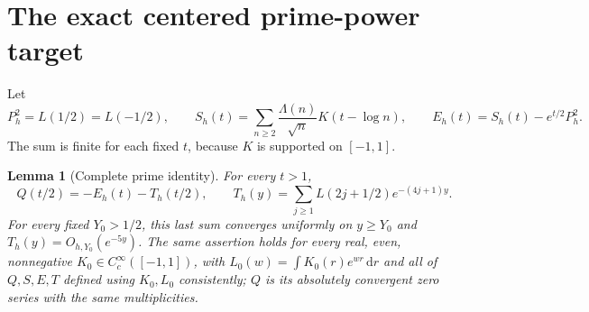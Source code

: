 \documentclass[11pt]{article}
\newtheorem{lemma}[theorem]{Lemma}
\theoremstyle{remark}\newtheorem{remark}[theorem]{Remark}
\newcommand{\dd}{\,\mathrm d}
\begin{document}
\section{The exact centered prime-power target}
Let
\[
 P_h^2=L(1/2)=L(-1/2),\qquad
 S_h(t)=\sum_{n\ge2}\frac{\Lambda(n)}{\sqrt n}K(t-\log n),
 \qquad E_h(t)=S_h(t)-e^{t/2}P_h^2.
\]
The sum is finite for each fixed $t$, because $K$ is supported on $[-1,1]$.

\begin{lemma}[Complete prime identity]\label{lem:prime}
For every $t>1$,
\[
 Q(t/2)=-E_h(t)-T_h(t/2),\qquad
 T_h(y)=\sum_{j\ge1}L(2j+1/2)e^{-(4j+1)y}.
\]
For every fixed $Y_0>1/2$, this last sum converges uniformly on
$y\ge Y_0$ and $T_h(y)=O_{h,Y_0}(e^{-5y})$.
The same assertion holds for every real, even, nonnegative
$K_0\in C_c^\infty([-1,1])$, with
$L_0(w)=\int K_0(r)e^{wr}\dd r$ and all of $Q,S,E,T$
defined using $K_0,L_0$ consistently; $Q$ is its absolutely
convergent zero series with the same multiplicities.
\end{lemma}
\end{document}
